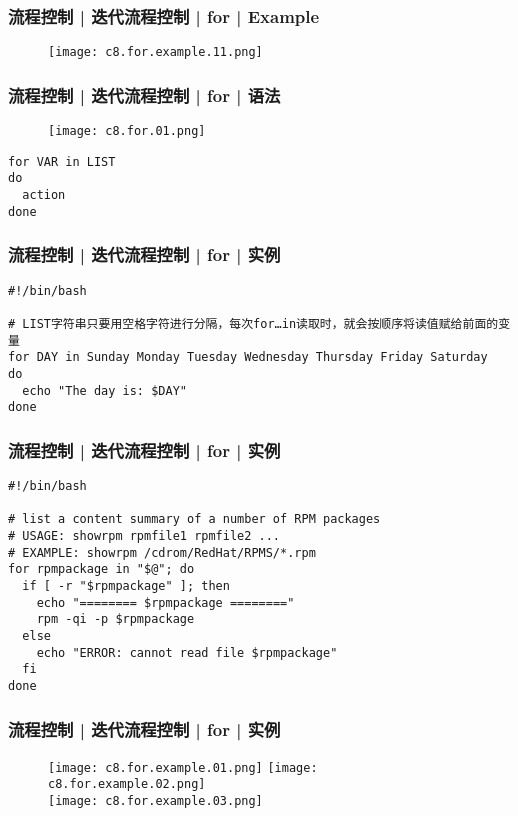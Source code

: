 \begin{frame}
  \frametitle{流程控制 | 迭代流程控制 | for | Example}
  \begin{figure}
    \centering
    \texttt{[image: c8.for.example.11.png]}
  \end{figure}
\end{frame}

\begin{frame}[fragile]
  \frametitle{流程控制 | 迭代流程控制 | for | \alert{语法}}
  \begin{figure}
    \centering
    \texttt{[image: c8.for.01.png]}
  \end{figure}
\begin{lstlisting}
for VAR in LIST
do
  action
done
\end{lstlisting}
\end{frame}

\begin{frame}[fragile]
  \frametitle{流程控制 | 迭代流程控制 | for | \alert{实例}}
\begin{lstlisting}
#!/bin/bash

# LIST字符串只要用空格字符进行分隔，每次for…in读取时，就会按顺序将读值赋给前面的变量
for DAY in Sunday Monday Tuesday Wednesday Thursday Friday Saturday
do
  echo "The day is: $DAY"
done
\end{lstlisting}
\end{frame}

\begin{frame}[fragile]
  \frametitle{流程控制 | 迭代流程控制 | for | 实例}
\begin{lstlisting}
#!/bin/bash

# list a content summary of a number of RPM packages
# USAGE: showrpm rpmfile1 rpmfile2 ...
# EXAMPLE: showrpm /cdrom/RedHat/RPMS/*.rpm
for rpmpackage in "$@"; do
  if [ -r "$rpmpackage" ]; then
    echo "======== $rpmpackage ========"
    rpm -qi -p $rpmpackage
  else
    echo "ERROR: cannot read file $rpmpackage"
  fi
done
\end{lstlisting}
\end{frame}

\begin{frame}
  \frametitle{流程控制 | 迭代流程控制 | for | \alert{实例}}
  \begin{figure}
    \texttt{[image: c8.for.example.01.png]}\quad
    \texttt{[image: c8.for.example.02.png]}\\
    \texttt{[image: c8.for.example.03.png]}
  \end{figure}
\end{frame}

